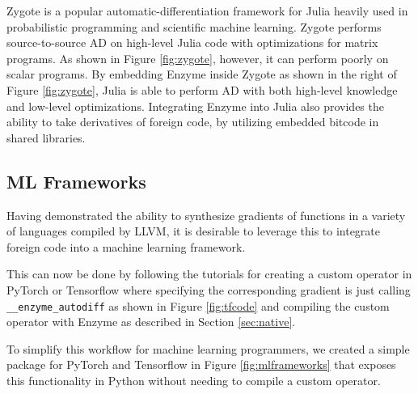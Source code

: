 Zygote \cite{zygoteArxiv, zygoteDP, zygoteMlsys} is a popular automatic-differentiation framework for Julia heavily used in probabilistic programming and scientific machine learning. Zygote performs source-to-source AD on high-level Julia code with optimizations for matrix programs. As shown in Figure \ref{fig:zygote}, however, it can perform poorly on scalar programs. By embedding Enzyme inside Zygote as shown in the right of Figure \ref{fig:zygote}, Julia is able to perform AD with both high-level knowledge and low-level optimizations. Integrating Enzyme into Julia also provides the ability to take derivatives of foreign code, by utilizing embedded bitcode in shared libraries.

\subsection{ML Frameworks}
Having demonstrated the ability to synthesize gradients of functions in a variety of languages compiled by LLVM, it is desirable to leverage this to integrate foreign code into a machine learning framework.

This can now be done by following the tutorials for creating a custom operator in PyTorch\cite{pytorchcustom} or Tensorflow \cite{tfcustom} where specifying the corresponding gradient is just calling \texttt{\_\_enzyme\_autodiff} as shown in Figure \ref{fig:tfcode} and compiling the custom operator with Enzyme as described in Section \ref{sec:native}.

To simplify this workflow for machine learning programmers, we created a simple package for PyTorch and Tensorflow in Figure \ref{fig:mlframeworks} that exposes this functionality in Python without needing to compile a custom operator.


